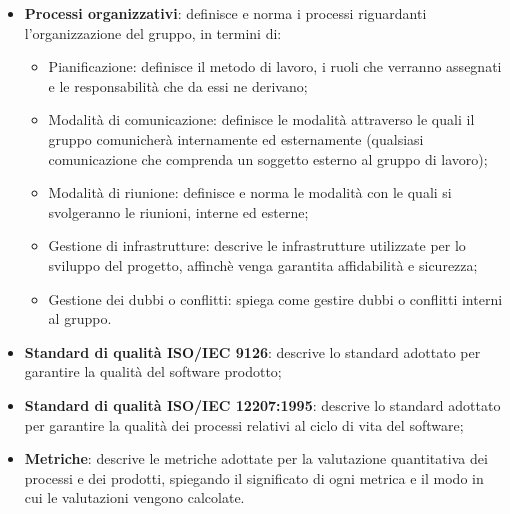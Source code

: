 \begin{itemize}
\begin{itemize}
                  \item \textbf{Processi organizzativi}: definisce e norma i processi riguardanti l'organizzazione del gruppo, in termini di:
                        \begin{itemize}
                              \item Pianificazione: definisce il metodo di lavoro, i ruoli che verranno assegnati e
                                    le responsabilità che da essi ne derivano;
                              \item Modalità di comunicazione: definisce le modalità attraverso le quali il gruppo
                                    comunicherà internamente ed esternamente (qualsiasi comunicazione che comprenda
                                    un soggetto esterno al gruppo di lavoro);
                              \item Modalità di riunione: definisce e norma le modalità con le quali si svolgeranno
                                    le riunioni, interne ed esterne;
                              \item Gestione di infrastrutture: descrive le infrastrutture utilizzate per lo
                                    sviluppo del progetto, affinchè venga garantita affidabilità e sicurezza;
                              \item Gestione dei dubbi o conflitti: spiega come gestire dubbi o conflitti interni
                                    al gruppo.
                        \end{itemize}

                  \item \textbf{Standard di qualità ISO/IEC 9126}: descrive lo standard adottato per garantire la qualità del software prodotto;
                  \item \textbf{Standard di qualità ISO/IEC 12207:1995}: descrive lo standard adottato per garantire la qualità dei processi relativi al ciclo di vita del software;
                  \item \textbf{Metriche}: descrive le metriche adottate per la valutazione quantitativa dei processi e dei prodotti, spiegando
                        il significato di ogni metrica e il modo in cui le valutazioni vengono calcolate.

            \end{itemize}
\end{itemize}
